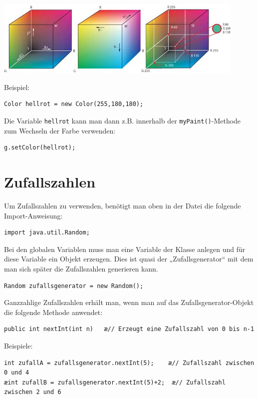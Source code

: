 \begin{center}
\includegraphics[width=0.9\textwidth]{./inf/SEKII/09_Java_Farben_und_Zufall/RGB_farbwuerfel.jpg}
\end{center}

Beispiel:

\begin{lstlisting}
Color hellrot = new Color(255,180,180);
\end{lstlisting}

Die Variable \lstinline|hellrot| kann man dann z.B. innerhalb der
\lstinline|myPaint()|-Methode zum Wechseln der Farbe verwenden:

\begin{lstlisting}
g.setColor(hellrot);
\end{lstlisting}


\section{Zufallszahlen}

\begin{compactenum}[a)]
\item Um Zufallszahlen zu verwenden, benötigt man oben in der Datei die folgende
 Import-Anweisung:

\begin{lstlisting}
import java.util.Random;
\end{lstlisting}

\item Bei den globalen Variablen muss man eine Variable der Klasse
 anlegen und für diese Variable ein Objekt erzeugen. Dies ist
quasi der „Zufallsgenerator“ mit dem man sich später die Zufallszahlen
generieren kann.

\begin{lstlisting}
Random zufallsgenerator = new Random();
\end{lstlisting}

\item Ganzzahlige Zufallszahlen erhält man, wenn man auf das
Zufallsgenerator-Objekt die folgende Methode anwendet:

\begin{lstlisting}
public int nextInt(int n)   æ// Erzeugt eine Zufallszahl von 0 bis n-1
\end{lstlisting}

Beispiele:

\begin{lstlisting}
int zufallA = zufallsgenerator.nextInt(5);    æ// Zufallszahl zwischen 0 und 4
æint zufallB = zufallsgenerator.nextInt(5)+2;  æ// Zufallszahl zwischen 2 und 6
\end{lstlisting}
\end{compactenum}
